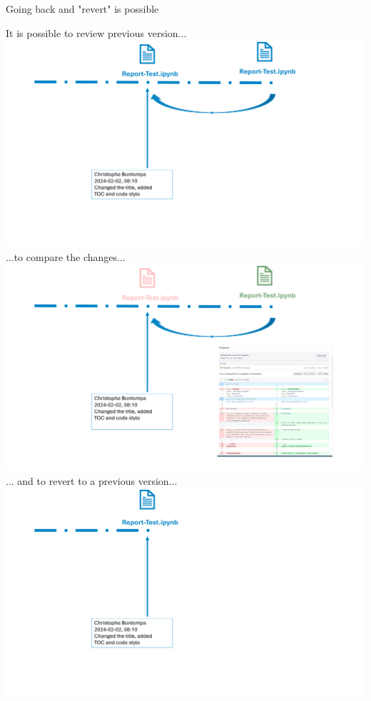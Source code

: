 \documentclass[xcolor=x11names,compress]{beamer}
\renewcommand{\(}{\begin{columns}}
\renewcommand{\)}{\end{columns}}
\newcommand{\<}[1]{\begin{column}{#1}}
\renewcommand{\>}{\end{column}}
\begin{document}
\begin{frame}{Going back and "revert" is possible}
\begin{center}
\begin{itemize}
    {It is possible to review previous version... \\ }
    {\includegraphics[width = 1.0\textwidth]{FileLifeBack.png} \\ }
    {...to compare the changes...  }
    {\includegraphics[width = 1.0\textwidth]{FileLifeDiff.png} \\ }
    {... and to revert  to a  previous version... }
    {\includegraphics[width = 1.0\textwidth]{FileLifeRevert.png} \\ }

\end{itemize}
\end{center}
\end{frame}
\end{document}
